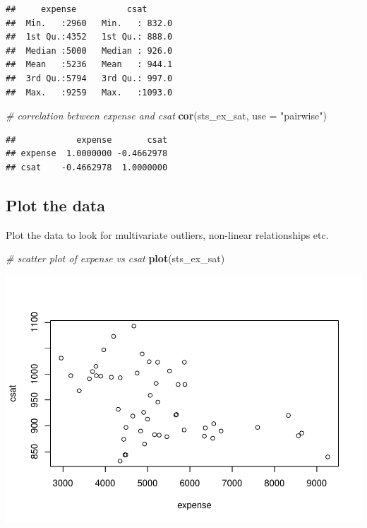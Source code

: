 \documentclass[
]{book}
\newenvironment{Shaded}{\begin{snugshade}}{\end{snugshade}}
\newcommand{\CommentTok}[1]{\textcolor[rgb]{0.56,0.35,0.01}{\textit{#1}}}
\newcommand{\DataTypeTok}[1]{\textcolor[rgb]{0.13,0.29,0.53}{#1}}
\newcommand{\KeywordTok}[1]{\textcolor[rgb]{0.13,0.29,0.53}{\textbf{#1}}}
\newcommand{\NormalTok}[1]{#1}
\newcommand{\StringTok}[1]{\textcolor[rgb]{0.31,0.60,0.02}{#1}}
\begin{document}
\begin{verbatim}
##     expense          csat       
##  Min.   :2960   Min.   : 832.0  
##  1st Qu.:4352   1st Qu.: 888.0  
##  Median :5000   Median : 926.0  
##  Mean   :5236   Mean   : 944.1  
##  3rd Qu.:5794   3rd Qu.: 997.0  
##  Max.   :9259   Max.   :1093.0
\end{verbatim}

\begin{Shaded}
\begin{Highlighting}[]
  \CommentTok{\# correlation between expense and csat}
  \KeywordTok{cor}\NormalTok{(sts\_ex\_sat, }\DataTypeTok{use =} \StringTok{"pairwise"}\NormalTok{) }
\end{Highlighting}
\end{Shaded}

\begin{verbatim}
##            expense       csat
## expense  1.0000000 -0.4662978
## csat    -0.4662978  1.0000000
\end{verbatim}

\hypertarget{plot-the-data}{%
\subsection{Plot the data}\label{plot-the-data}}

Plot the data to look for multivariate outliers, non-linear relationships etc.

\begin{Shaded}
\begin{Highlighting}[]
  \CommentTok{\# scatter plot of expense vs csat}
  \KeywordTok{plot}\NormalTok{(sts\_ex\_sat)}
\end{Highlighting}
\end{Shaded}

\includegraphics{R/Rmodels/figures/unnamed-chunk-83-1.pdf}
\end{document}

